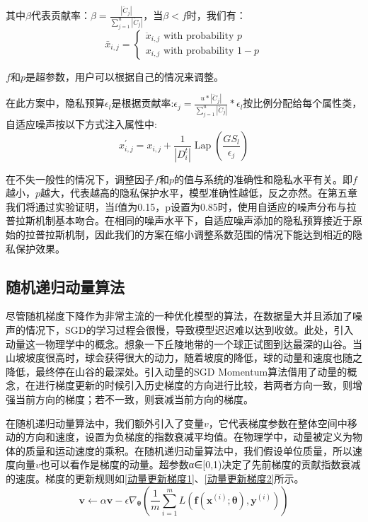 其中$\beta$代表贡献率：$\beta=\frac{\left|\ddot{C}_{j}\right|}{\sum_{j=1}^{u}\left|\ddot{C}_{j}\right|}$，当$\beta<f$时，我们有：
\begin{equation}\label{eq:神经网络加噪2}
\bar{x}_{i, j}=\left\{\begin{array}{l}
\ddot{x}_{i, j} \text { with probability } p \\
x_{i, j} \text { with probability } 1-p
\end{array}\right.
\end{equation}


$f$和$p$是超参数，用户可以根据自己的情况来调整。

在此方案中，隐私预算$\epsilon_{l}$是根据贡献率:$\epsilon_{j}=\frac{u *\left|\ddot{C}_{j}\right|}{\sum_{j=1}^{u}\left|\ddot{C}_{j}\right|} * \epsilon_{l}$按比例分配给每个属性类，自适应噪声按以下方式注入属性中:
\begin{equation}\label{eq:神经网络加噪3}
x_{i, j}^{\prime}=x_{i, j}+\frac{1}{\left|D_{i}^{t}\right|} \operatorname{Lap}\left(\frac{G S_{l}}{\epsilon_{j}}\right)
\end{equation}

在不失一般性的情况下，调整因子$f$和$p$的值与系统的准确性和隐私水平有关。即$f$越小，$p$越大，代表越高的隐私保护水平，模型准确性越低，反之亦然。在第五章我们将通过实验证明，当f值为0.15，p设置为0.85时，使用自适应的噪声分布与拉普拉斯机制基本吻合。在相同的噪声水平下，自适应噪声添加的隐私预算接近于原始的拉普拉斯机制，因此我们的方案在缩小调整系数范围的情况下能达到相近的隐私保护效果。

\subsection{随机递归动量算法}
尽管随机梯度下降作为非常主流的一种优化模型的算法，在数据量大并且添加了噪声的情况下，SGD的学习过程会很慢，导致模型迟迟难以达到收敛。此处，引入动量这一物理学中的概念。想象一下丘陵地带的一个球正试图到达最深的山谷。当山坡坡度很高时，球会获得很大的动力，随着坡度的降低，球的动量和速度也随之降低，最终停在山谷的最深处。引入动量的SGD Momentum算法借用了动量的概念，在进行梯度更新的时候引入历史梯度的方向进行比较，若两者方向一致，则增强当前方向的梯度；若不一致，则衰减当前方向的梯度。

在随机递归动量算法中，我们额外引入了变量$v$，它代表梯度参数在整体空间中移动的方向和速度，设置为负梯度的指数衰减平均值。在物理学中，动量被定义为物体的质量和运动速度的乘积。在随机递归动量算法中，我们假设单位质量，所以速度向量$v$也可以看作是梯度的动量。超参数α∈[0,1)决定了先前梯度的贡献指数衰减的速度。梯度的更新规则如\ref{动量更新梯度1}、\ref{动量更新梯度2}所示。
\begin{equation}\label{动量更新梯度1}
\boldsymbol{v} \leftarrow \alpha \boldsymbol{v}-\epsilon \nabla_{\boldsymbol{\theta}}\left(\frac{1}{m} \sum_{i=1}^{m} L\left(\boldsymbol{f}\left(\boldsymbol{x}^{(i)} ; \boldsymbol{\theta}\right), \boldsymbol{y}^{(i)}\right)\right)
\end{equation}

